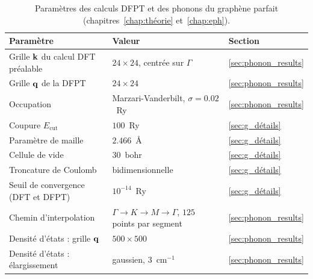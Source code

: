 \clearpage
\vspace*{\fill}
\begin{table}[H]
    \centering
    \caption[Paramètres des calculs DFPT et des phonons.]{Paramètres des calculs DFPT et des phonons du graphène parfait (chapitres~\ref{chap:théorie} et~\ref{chap:eph}).}
    \label{tab:param_dfpt}
    \small
    \setlength{\tabcolsep}{4pt}
    \begin{tabular}{p{} p{} p{}}
        \hline\hline
        Paramètre & Valeur & Section \\
        \hline
        Grille $\mathbf{k}$ du calcul DFT préalable & $24\times 24$, centrée sur $\Gamma$ & \ref{sec:phonon_results} \\
        Grille $\mathbf{q}$ de la DFPT & $24\times 24$ & \ref{sec:phonon_results} \\
        Occupation & Marzari-Vanderbilt, $\sigma = 0.02$~Ry & \ref{sec:phonon_results} \\
        Coupure $E_\text{cut}$ & $100$~Ry & \ref{sec:g_détails} \\
        Paramètre de maille & $2.466$~\AA & \ref{sec:g_détails} \\
        Cellule de vide & $30$~bohr & \ref{sec:g_détails} \\
        Troncature de Coulomb & bidimensionnelle & \ref{sec:g_détails} \\
        Seuil de convergence (DFT et DFPT) & $10^{-14}$~Ry & \ref{sec:g_détails} \\
        Chemin d'interpolation & $\Gamma\to K\to M\to\Gamma$, $125$ points par segment & \ref{sec:phonon_results} \\
        Densité d'états : grille $\mathbf{q}$ & $500\times 500$ & \ref{sec:phonon_results} \\
        Densité d'états : élargissement & gaussien, $3$~cm$^{-1}$ & \ref{sec:phonon_results} \\
        \hline\hline
    \end{tabular}
\end{table}
\vspace*{\fill}
\clearpage
